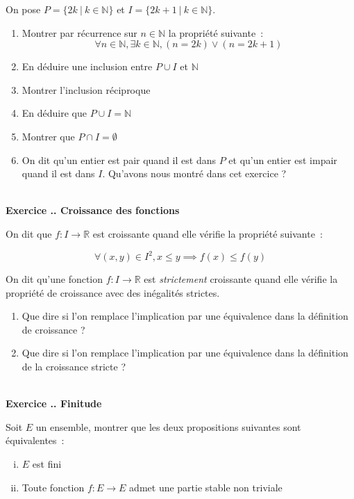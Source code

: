 \documentclass{article}
\newcommand{\mb}[1]{\mathbb{#1}}
\newcounter{exo}
\newcommand{\exercice}[1][\null]{\textbf{\\ \large Exercice \thesection.\theexo. \normalsize #1} \addtocounter{exo}{1}}
\begin{document}
On pose $P = \{ 2k ~|~ k \in \mathbb{N} \}$ et $I = \{ 2k + 1 ~|~ k \in
\mathbb{N} \}$.

\begin{enumerate}
    \item Montrer par récurrence sur $n \in \mathbb{N}$ la propriété suivante~:
        \begin{equation}
            \forall n \in \mathbb{N}, \exists k \in \mathbb{N}, (n = 2k) \vee 
            (n = 2k + 1)
        \end{equation}
    \item En déduire une inclusion entre $P \cup I$ et $\mathbb{N}$
    \item Montrer l'inclusion réciproque
    \item En déduire que $P \cup I = \mathbb{N}$
    \item Montrer que $P \cap I = \emptyset$
    \item On dit qu'un entier est pair quand il est dans $P$ et qu'un 
        entier est impair quand il est dans $I$. Qu'avons nous montré 
        dans cet exercice ?
\end{enumerate}

\exercice[Croissance des fonctions]

On dit que $f : I \to \mb{R}$ est croissante 
quand elle vérifie la propriété suivante~:

\begin{equation}
    \forall (x,y) \in I^2, x \leq y \implies f(x) \leq f(y)
\end{equation}

On dit qu'une fonction $f : I \to \mb{R}$ est \emph{strictement}
croissante quand elle vérifie la propriété de croissance avec 
des inégalités strictes.

\begin{enumerate}
    \item Que dire si l'on remplace l'implication par une équivalence 
        dans la définition de croissance ?
    \item Que dire si l'on remplace l'implication par une équivalence 
        dans la définition de la croissance stricte ?
\end{enumerate}


\exercice[Finitude]

Soit $E$ un ensemble, montrer que les deux propositions suivantes 
sont équivalentes~:

\begin{enumerate}[(i)]
    \item $E$ est fini
    \item Toute fonction $f : E \to E$ admet une partie stable non 
        triviale
\end{enumerate}
\end{document}
